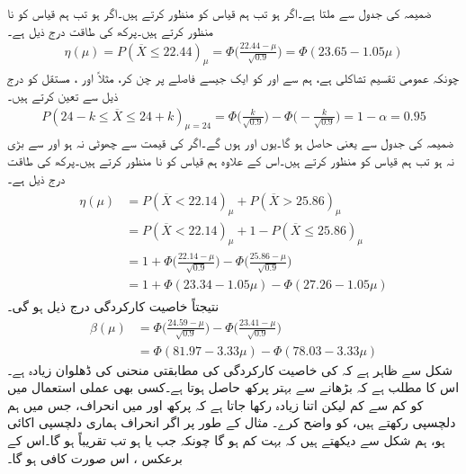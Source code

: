 ضمیمہ  کی جدول   سے  ملتا ہے۔اگر  ہو تب ہم قیاس کو منظور کرتے ہیں۔اگر  ہو تب ہم قیاس کو نا منظور کرتے ہیں۔پرکھ کی طاقت درج ذیل ہے۔
\begin{align}
\eta(\mu)=P(\overline{X}\le 22.44)_{\mu}=\Phi\big(\frac{22.44-\mu}{\sqrt{0.9}}\big)=\Phi(23.65-1.05\mu)
\end{align}
\quad
چونکہ عمومی تقسیم تشاکلی ہے، ہم  سے  اور  کو ایک جیسے فاصلے پر چن کر، مثلاً  اور ، مستقل  کو درج ذیل سے تعین کرتے ہیں۔
\begin{align*}
P(24-k\le \overline{X}\le 24+k)_{\mu=24}=\Phi\big(\frac{k}{\sqrt{0.9}}\big)-\Phi\big(-\frac{k}{\sqrt{0.9}}\big)=1-\alpha=0.95
\end{align*}
ضمیمہ  کی جدول  سے  یعنی  حاصل ہو گا۔یوں  اور  ہوں گے۔اگر  کی قیمت  سے چھوٹی نہ ہو اور  سے بڑی نہ ہو تب ہم قیاس کو منظور کرتے ہیں۔اس کے علاوہ ہم قیاس کو نا منظور کرتے ہیں۔پرکھ کی طاقت درج ذیل ہے۔
\begin{gather}
\begin{aligned}
\eta(\mu)&=P(\overline{X}<22.14)_{\mu}+P(\overline{X}>25.86)_{\mu}\\
&=P(\overline{X}<22.14)_{\mu}+1-P(\overline{X}\le 25.86)_{\mu}\\
&=1+\Phi\big(\frac{22.14-\mu}{\sqrt{0.9}}\big)-\Phi\big(\frac{25.86-\mu}{\sqrt{0.9}}\big)\\
&=1+\Phi(23.34-1.05\mu)-\Phi(27.26-1.05\mu)
\end{aligned}
\end{gather}
نتیجتاً خاصیت کارکردگی  درج ذیل ہو گی۔
\begin{align*}
\beta(\mu)&=\Phi\big(\frac{24.59-\mu}{\sqrt{0.9}}\big)-\Phi\big(\frac{23.41-\mu}{\sqrt{0.9}}\big)\\
&=\Phi(81.97-3.33\mu)-\Phi(78.03-3.33\mu)
\end{align*}
شکل سے ظاہر ہے کہ  کی خاصیت کارکردگی کی مطابقتی منحنی کی ڈھلوان زیادہ ہے۔اس کا مطلب ہے کہ  بڑھانے سے بہتر پرکھ حاصل ہوتا ہے۔کسی بھی عملی استعمال میں  کو کم سے کم لیکن اتنا زیادہ رکھا جاتا ہے کہ پرکھ  اور  میں انحراف، جس میں ہم دلچسپی رکھتے ہیں، کو  واضح  کرے۔ مثال کے طور پر اگر انحراف ہماری دلچسپی   اکائی ہو، ہم شکل سے دیکھتے ہیں کہ  بہت کم ہو گا چونکہ جب  یا  ہو تب  تقریباً  ہو گا۔اس کے برعکس ،  اس صورت کافی ہو گا۔

